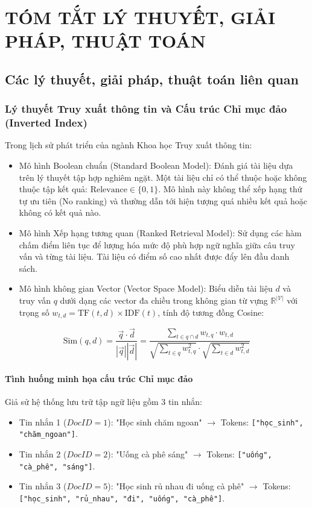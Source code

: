 \documentclass[12pt,a4paper,oneside]{report}
\begin{document}
\chapter{TÓM TẮT LÝ THUYẾT, GIẢI PHÁP, THUẬT TOÁN}

\section{Các lý thuyết, giải pháp, thuật toán liên quan}

\subsection{Lý thuyết Truy xuất thông tin và Cấu trúc Chỉ mục đảo (Inverted Index)}
Trong lịch sử phát triển của ngành Khoa học Truy xuất thông tin:
\begin{itemize}
    \item Mô hình Boolean chuẩn (Standard Boolean Model): Đánh giá tài liệu dựa trên lý thuyết tập hợp nghiêm ngặt. Một tài liệu chỉ có thể thuộc hoặc không thuộc tập kết quả: $\text{Relevance} \in \{0, 1\}$. Mô hình này không thể xếp hạng thứ tự ưu tiên (No ranking) và thường dẫn tới hiện tượng quá nhiều kết quả hoặc không có kết quả nào.
    \item Mô hình Xếp hạng tương quan (Ranked Retrieval Model): Sử dụng các hàm chấm điểm liên tục để lượng hóa mức độ phù hợp ngữ nghĩa giữa câu truy vấn và từng tài liệu. Tài liệu có điểm số cao nhất được đẩy lên đầu danh sách.
    \item Mô hình không gian Vector (Vector Space Model): Biểu diễn tài liệu $d$ và truy vấn $q$ dưới dạng các vector đa chiều trong không gian từ vựng $\mathbb{R}^{|\mathcal{V}|}$ với trọng số $w_{t, d} = \text{TF}(t, d) \times \text{IDF}(t)$, tính độ tương đồng Cosine:
\end{itemize}

\begin{equation}
\text{Sim}(q, d) = \frac{\vec{q} \cdot \vec{d}}{|\vec{q}| |\vec{d}|} = \frac{\sum_{t \in q \cap d} w_{t, q} \cdot w_{t, d}}{\sqrt{\sum_{t \in q} w_{t, q}^2} \cdot \sqrt{\sum_{t \in d} w_{t, d}^2}}
\end{equation}

\subsubsection{Tình huống minh họa cấu trúc Chỉ mục đảo}
Giả sử hệ thống lưu trữ tập ngữ liệu gồm 3 tin nhắn:
\begin{itemize}
    \item Tin nhắn 1 ($DocID = 1$): "Học sinh chăm ngoan" $\to$ Tokens: \texttt{["học\_sinh", "chăm\_ngoan"]}.
    \item Tin nhắn 2 ($DocID = 2$): "Uống cà phê sáng" $\to$ Tokens: \texttt{["uống", "cà\_phê", "sáng"]}.
    \item Tin nhắn 3 ($DocID = 5$): "Học sinh rủ nhau đi uống cà phê" $\to$ Tokens: \texttt{["học\_sinh", "rủ\_nhau", "đi", "uống", "cà\_phê"]}.
\end{itemize}
\end{document}

